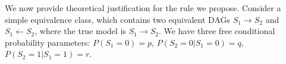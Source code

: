 \documentclass{edm_template}
\begin{document}
We now provide theoretical justification for the  rule we  propose.
%
Consider a simple equivalence class, which contains two equivalent DAGs $S_1\rightarrow S_2$ and $S_1\leftarrow S_2$, where the true model is $S_1\rightarrow S_2$.
We have three free conditional probability parameters: $P(S_1=0)=p$, $P(S_2=0|S_1=0)=q$, $P(S_2=1|S_1=1)=r$.
\end{document}
